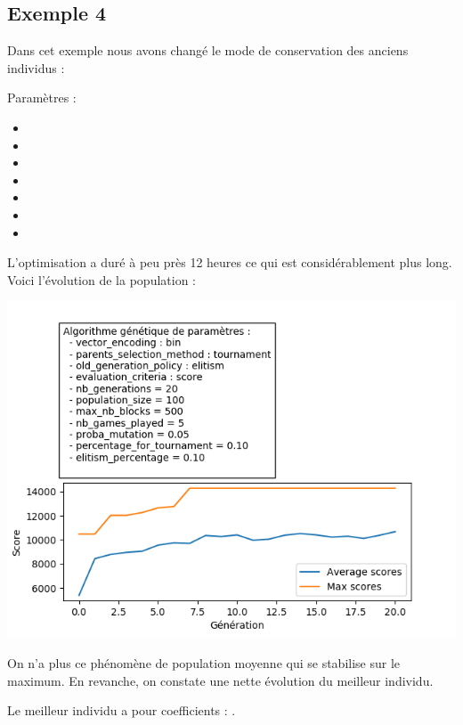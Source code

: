 \newpage

\subsection{Exemple 4}

Dans cet exemple nous avons changé le mode de conservation des anciens individus :

Paramètres :
\begin{itemize}
	\item {}
	\item {}
	\item {}
	\item {}
	\item {}
	\item {}
	\item {}
\end{itemize} 

L'optimisation a duré à peu près 12 heures ce qui est considérablement plus long. Voici l'évolution de la population :

\includegraphics[scale=0.95]{media/results/AG12.png}

On n'a plus ce phénomène de population moyenne qui se stabilise sur le maximum. En revanche, on constate une nette évolution du meilleur individu.

\medskip

Le meilleur individu a pour coefficients : \pyth{[0.0.016, 0.007, 0.5937, 0.0198]}.
\newpage

